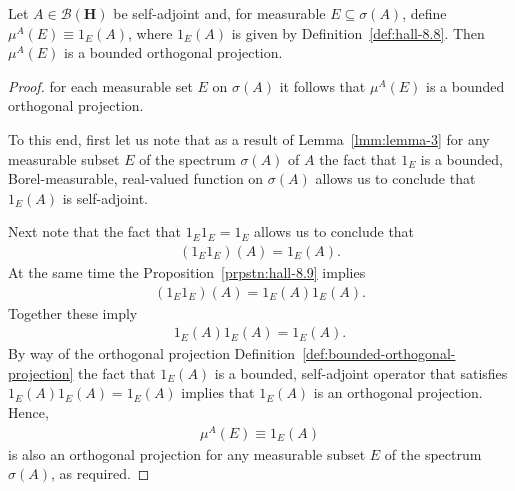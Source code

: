 \begin{proposition}
    \label{prpstn:mua-projection}
    \leanok
    Let $A \in \mathcal{B}(\mathbf{H})$ be self-adjoint and, for measurable $E \subseteq \sigma(A)$, define $\mu^A(E) \equiv 1_E(A)$, where $1_E(A)$ is given by Definition~\ref{def:hall-8.8}. Then $\mu^A(E)$ is a bounded orthogonal projection.
\end{proposition}
\begin{proof}
    \leanok
for each measurable set $E$ on $\sigma(A)$ it follows that $\mu^A(E)$ is a bounded orthogonal projection.

To this end, first let us note that as a result of Lemma~\ref{lmm:lemma-3} for any measurable subset $E$ of the spectrum $\sigma(A)$ of $A$ the fact that $1_E$ is a bounded, Borel-measurable, real-valued function on $\sigma(A)$ allows us to conclude that $1_E(A)$ is self-adjoint.

Next note that the fact that $1_E 1_E = 1_E$ allows us to conclude that
\begin{align}
    (1_E1_E)(A) = 1_E(A).
\end{align}
At the same time the Proposition~\ref{prpstn:hall-8.9} implies
\begin{align}
    (1_E1_E)(A) = 1_E(A)1_E(A).
\end{align}
Together these imply
\begin{align}
    1_E(A)1_E(A) = 1_E(A).
\end{align}
By way of the orthogonal projection Definition~\ref{def:bounded-orthogonal-projection} the fact that $1_E(A)$ is a bounded, self-adjoint operator that satisfies $1_E(A)1_E(A) = 1_E(A)$ implies that $1_E(A)$ is an orthogonal projection. Hence,
\begin{align}
    \mu^A(E) \equiv 1_E(A)
\end{align}
is also an orthogonal projection for any measurable subset $E$ of the spectrum $\sigma(A)$, as required.
\end{proof}

